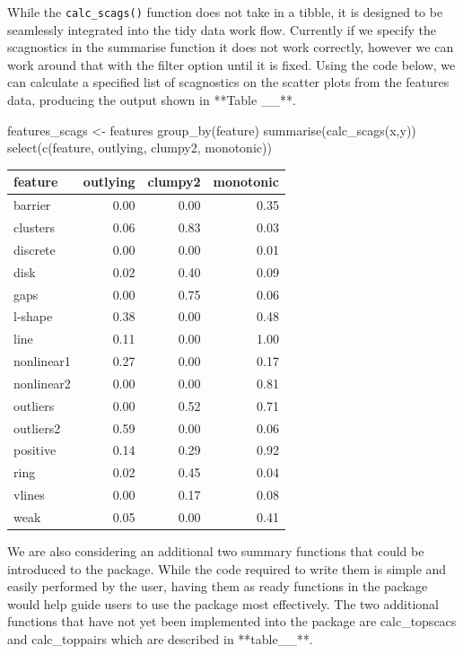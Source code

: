 While the \texttt{calc\_scags()} function does not take in a tibble, it
is designed to be seamlessly integrated into the tidy data work flow.
Currently if we specify the scagnostics in the summarise function it
does not work correctly, however we can work around that with the filter
option until it is fixed. Using the code below, we can calculate a
specified list of scagnostics on the scatter plots from the features
data, producing the output shown in **Table \_\_**.

\begin{Schunk}
\begin{Sinput}
features_scags <- features %
  group_by(feature) %
  summarise(calc_scags(x,y)) %
  select(c(feature, outlying, clumpy2, monotonic))
\end{Sinput}
\end{Schunk}

\begin{Schunk}

\begin{tabular}{l|r|r|r}
\hline
feature & outlying & clumpy2 & monotonic\\
\hline
barrier & 0.00 & 0.00 & 0.35\\
\hline
clusters & 0.06 & 0.83 & 0.03\\
\hline
discrete & 0.00 & 0.00 & 0.01\\
\hline
disk & 0.02 & 0.40 & 0.09\\
\hline
gaps & 0.00 & 0.75 & 0.06\\
\hline
l-shape & 0.38 & 0.00 & 0.48\\
\hline
line & 0.11 & 0.00 & 1.00\\
\hline
nonlinear1 & 0.27 & 0.00 & 0.17\\
\hline
nonlinear2 & 0.00 & 0.00 & 0.81\\
\hline
outliers & 0.00 & 0.52 & 0.71\\
\hline
outliers2 & 0.59 & 0.00 & 0.06\\
\hline
positive & 0.14 & 0.29 & 0.92\\
\hline
ring & 0.02 & 0.45 & 0.04\\
\hline
vlines & 0.00 & 0.17 & 0.08\\
\hline
weak & 0.05 & 0.00 & 0.41\\
\hline
\end{tabular}

\end{Schunk}

We are also considering an additional two summary functions that could
be introduced to the package. While the code required to write them is
simple and easily performed by the user, having them as ready functions
in the package would help guide users to use the package most
effectively. The two additional functions that have not yet been
implemented into the package are calc\_topscacs and calc\_toppairs which
are described in **table\_\_**.

